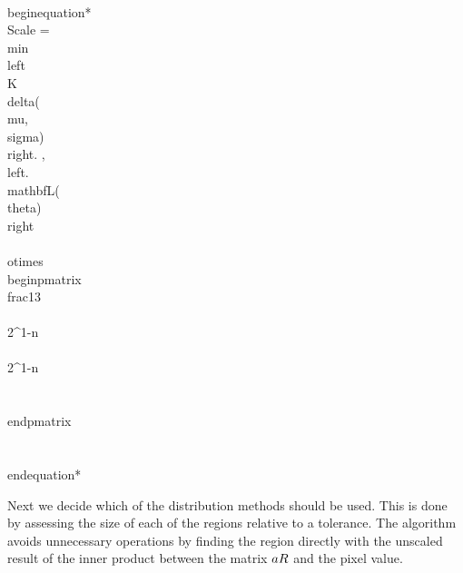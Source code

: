 \\begin{equation*}
\\Scale =
 \\min\\left\\{K \\delta(\\mu,\\sigma) \\right. ,  \\left. \\mathbf{L}(\\theta) \\right\\}  \\otimes
\\begin{pmatrix}
  \\frac{1}{3} \\\\
 2^{1-n } \\\\
 2^{1-n }  \\\\
\\end{pmatrix}    \\\\
\\end{equation*}

Next we decide which of the distribution methods should be used. This is done by assessing the size of each of the regions relative to a tolerance. The algorithm avoids unnecessary operations by finding the region directly with the unscaled result of the inner product between the matrix $\\aR$ and the pixel value.

